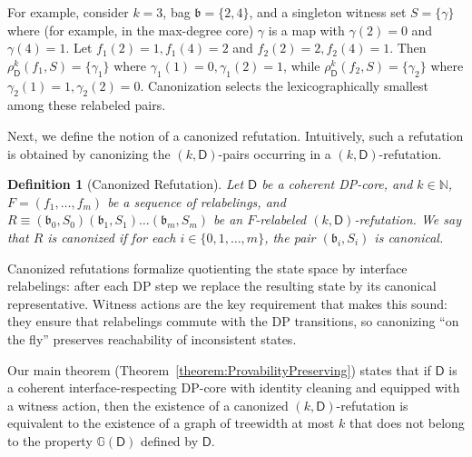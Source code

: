 \documentclass[11pt,a4paper]{article}
\newtheorem{definition}[theorem]{Definition}
\newcommand{\treewidthvalue}{k}
\newcommand{\N}{\mathbb{N}}
\newcommand{\abag}{\mathfrak{b}}
\newcommand{\dpcoregraphproperty}[1]{\mathbb{G}(#1)}
\newcommand{\dpcore}{\mathsf{D}}
\newcommand{\witnessset}{S}
\newcommand{\dprefutation}{R}
\newcommand{\action}{\rho}
\begin{document}
For example, consider $k=3$, bag $\abag=\{2,4\}$, and a singleton witness set $\witnessset=\{\gamma\}$ where (for example, in the max-degree core) $\gamma$ is a map with $\gamma(2)=0$ and $\gamma(4)=1$.
Let $f_1(2)=1,f_1(4)=2$ and $f_2(2)=2,f_2(4)=1$.
Then $\action_{\dpcore}^{\treewidthvalue}(f_1,\witnessset)=\{\gamma_1\}$ where $\gamma_1(1)=0,\gamma_1(2)=1$, while $\action_{\dpcore}^{\treewidthvalue}(f_2,\witnessset)=\{\gamma_2\}$ where $\gamma_2(1)=1,\gamma_2(2)=0$.
Canonization selects the lexicographically smallest among these relabeled pairs.



Next, we define the notion of a canonized refutation. Intuitively, such a refutation is obtained by canonizing the $(\treewidthvalue,\dpcore)$-pairs occurring in a
$(\treewidthvalue,\dpcore)$-refutation.

	\begin{definition}[Canonized Refutation]\label{definition:canonizedrefutation}
	Let $\dpcore$ be a coherent DP-core, and $\treewidthvalue\in \N$, $F=(f_1,\dots,f_m)$ be a sequence of relabelings, and
	$\dprefutation \equiv (\abag_0,\witnessset_0)(\abag_1,\witnessset_1)\dots (\abag_m,\witnessset_m)$
	be an $F$-relabeled $(\treewidthvalue,\dpcore)$-refutation. We say that $\dprefutation$ is canonized if for each $i\in \{0,1,\dots,m\}$, the pair $(\abag_i,\witnessset_i)$ is canonical.
	\end{definition}


Canonized refutations formalize quotienting the state space by interface relabelings: after each DP step we replace the resulting state by its canonical representative. Witness actions are the key requirement that makes this sound: they ensure that relabelings commute with the DP transitions, so canonizing ``on the fly'' preserves reachability of inconsistent states.

Our main theorem (Theorem~\ref{theorem:ProvabilityPreserving}) states that if $\dpcore$ is a coherent interface-respecting DP-core with identity cleaning and equipped with a witness action, then the existence of a canonized
$(\treewidthvalue,\dpcore)$-refutation is equivalent to the existence of a graph of treewidth
at most $\treewidthvalue$ that does not belong to the property
$\dpcoregraphproperty{\dpcore}$ defined by $\dpcore$.
\end{document}
